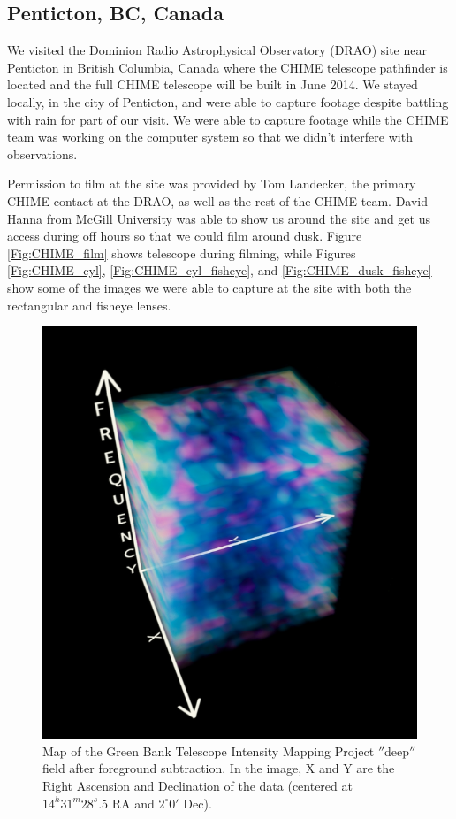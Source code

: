\subsection{Penticton, BC, Canada}
We visited the Dominion Radio Astrophysical Observatory (DRAO) site near Penticton in British Columbia, Canada where the CHIME telescope pathfinder is located and the full CHIME telescope will be built in June 2014. We stayed locally, in the city of Penticton, and were able to capture footage despite battling with rain for part of our visit. We were able to capture footage while the CHIME team was working on the computer system so that we didn't interfere with observations. 

Permission to film at the site was provided by Tom Landecker, the primary CHIME contact at the DRAO, as well as the rest of the CHIME team. David Hanna from McGill University was able to show us around the site and get us access during off hours so that we could film around dusk. Figure \ref{Fig:CHIME_film} shows telescope during filming, while Figures \ref{Fig:CHIME_cyl}, \ref{Fig:CHIME_cyl_fisheye}, and \ref{Fig:CHIME_dusk_fisheye} show some of the images we were able to capture at the site with both the rectangular and fisheye lenses. 

\begin{figure}[htb]
\begin{center}
\includegraphics[width=0.95\linewidth]{Planetarium/figures/GBT_cm_map.jpg}
\caption{Map of the Green Bank Telescope Intensity Mapping Project $''$deep$''$ field after foreground subtraction. In the image, X and Y are the Right Ascension and Declination of the data (centered at $14^h 31^m 28^s.5$ RA and $2^\circ 0'$ Dec). }
\label{Fig:GBT_cm_map}
\end{center}
\end{figure}

